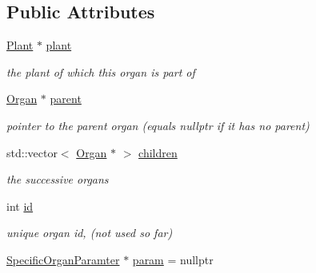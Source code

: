 \subsection*{Public Attributes}
\begin{DoxyCompactItemize}
\item 
\mbox{\label{classCPlantBox_1_1Organ_ac614456886ab270c6fd2617403e0f306}} 
\hyperlink{classCPlantBox_1_1Plant}{Plant} $\ast$ \hyperlink{classCPlantBox_1_1Organ_ac614456886ab270c6fd2617403e0f306}{plant}
\begin{DoxyCompactList}\small\item\em the plant of which this organ is part of \end{DoxyCompactList}\item 
\mbox{\label{classCPlantBox_1_1Organ_a8ad90078d5ef859bd2ab71700854e286}} 
\hyperlink{classCPlantBox_1_1Organ}{Organ} $\ast$ \hyperlink{classCPlantBox_1_1Organ_a8ad90078d5ef859bd2ab71700854e286}{parent}
\begin{DoxyCompactList}\small\item\em pointer to the parent organ (equals nullptr if it has no parent) \end{DoxyCompactList}\item 
\mbox{\label{classCPlantBox_1_1Organ_ab664ce01c2d6a2f4090408b8b1d438dd}} 
std\+::vector$<$ \hyperlink{classCPlantBox_1_1Organ}{Organ} $\ast$ $>$ \hyperlink{classCPlantBox_1_1Organ_ab664ce01c2d6a2f4090408b8b1d438dd}{children}
\begin{DoxyCompactList}\small\item\em the successive organs \end{DoxyCompactList}\item 
\mbox{\label{classCPlantBox_1_1Organ_a4c567a27db0b5e4262067f4cbbf59553}} 
int \hyperlink{classCPlantBox_1_1Organ_a4c567a27db0b5e4262067f4cbbf59553}{id}
\begin{DoxyCompactList}\small\item\em unique organ id, (not used so far) \end{DoxyCompactList}\item 
\mbox{\label{classCPlantBox_1_1Organ_a59ba6de6ced8b8d7b20788bd7656cee2}} 
\hyperlink{classCPlantBox_1_1SpecificOrganParamter}{Specific\+Organ\+Paramter} $\ast$ \hyperlink{classCPlantBox_1_1Organ_a59ba6de6ced8b8d7b20788bd7656cee2}{param} = nullptr

\end{DoxyCompactItemize}
